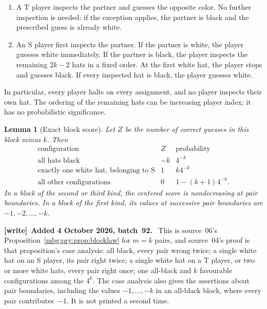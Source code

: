 \documentclass[11pt,letterpaper]{article}
\newtheorem{lemma}[theorem]{Lemma}
\theoremstyle{definition}
\newenvironment{writenote}[1][]{\par\smallskip\begingroup\small
 \noindent\textbf{[write]}\if\relax\detokenize{#1}\relax\else~\textbf{#1.}\fi\ }%
 {\par\endgroup\smallskip}
\begin{document}
\begin{enumerate}
\item A T player inspects the partner and guesses the opposite color.  No
further inspection is needed: if the exception applies, the partner is
black and the prescribed guess is already white.
\item An S player first inspects the partner.  If the partner is white,
the player guesses white immediately.  If the partner is black, the player
inspects the remaining $2k-2$ hats in a fixed order.  At the first white hat,
the player stops and guesses black.  If every inspected hat is black, the
player guesses white.
\end{enumerate}

In particular, every player halts on every assignment, and no player
inspects their own hat.  The ordering of the remaining hats can be increasing
player index; it has no probabilistic significance.

\begin{lemma}[Exact block score]\label{mbg:insp:con-block-score}
Let $Z$ be the number of correct guesses in this block minus $k$.  Then
\[
\begin{array}{c|c|c}
\text{configuration}&Z&\text{probability}\\ \hline
\text{all hats black}&-k&4^{-k}\\
\text{exactly one white hat, belonging to S}&1&k4^{-k}\\
\text{all other configurations}&0&1-(k+1)4^{-k}.
\end{array}
\]
In a block of the second or third kind, the centered score is nondecreasing
at pair boundaries.  In a block of the first kind, its values at successive
pair boundaries are $-1,-2,\ldots,-k$.
\end{lemma}

\begin{writenote}[Added 4 October 2026, batch~92]
This is source~06's Proposition~\ref{mbg:qry:prop:blocklaw} for $m=k$ pairs, and source~04's proof is that proposition's case analysis: all black, every pair wrong twice; a single white hat on an S player, its pair right twice; a single white hat on a T player, or two or more white hats, every pair right once; one all-black and $k$ favourable configurations among the $4^k$. The case analysis also gives the assertions about pair boundaries, including the values $-1,\ldots,-k$ in an all-black block, where every pair contributes~$-1$. It is not printed a second time.
\end{writenote}
\end{document}
